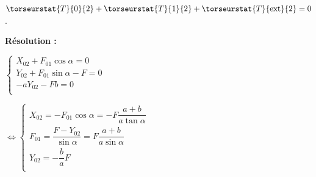 \begin{corrigebox}[Corrigé]
$\torseurstat{T}{0}{2} + \torseurstat{T}{1}{2}+\torseurstat{T}{\text{ext}}{2} = {0}$.

 \textbf{Résolution :}

$\left\{ \begin{array}{l}
X_{02}+F_{01}\cos\alpha  = 0 \\
Y_{02}+F_{01}\sin\alpha  -F= 0 \\
-aY_{02}-Fb  = 0 \\
\end{array}
\right.$

$
\Leftrightarrow 
\left\{ \begin{array}{l}
X_{02}=-F_{01}\cos\alpha  =-F\dfrac{a+b}{a\tan\alpha} \\
F_{01}  =\dfrac{F-Y_{02}}{\sin\alpha}=F\dfrac{a+b}{a\sin\alpha} \\
Y_{02} = -\dfrac{b}{a}F  \\
\end{array}
\right.$
\end{corrigebox}
